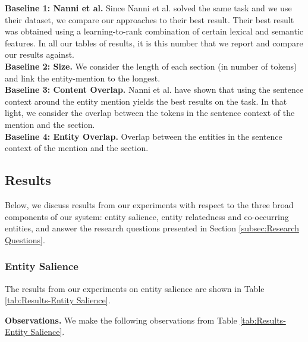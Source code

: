 \documentclass[sigconf,authordraft]{acmart}
\begin{document}
\textbf{Baseline 1: Nanni et al.} Since Nanni et al. \cite{nanni2018entity} solved the same task and we use their dataset, we compare our approaches to their best result. Their best result was obtained using a learning-to-rank combination of certain lexical and semantic features. In all our tables of results, it is this number that we report and compare our results against.\\
\textbf{Baseline 2: Size.} We consider the length of each section (in number of tokens) and link the entity-mention to the longest. \\
\textbf{Baseline 3: Content Overlap.} Nanni et al. \cite{nanni2018entity} have shown that using the sentence context around the entity mention yields the best results on the task. In that light, we consider the overlap between the tokens in the sentence context of the mention and the section. \\
\textbf{Baseline 4: Entity Overlap.} Overlap between the entities in the sentence context of the mention and the section. \\

\subsection{Results}
\label{subsec:Results}
Below, we discuss results from our experiments with respect to the three broad components of our system: entity salience, entity relatedness and co-occurring entities, and answer the research questions presented in Section \ref{subsec:Research Questions}.

\subsubsection{Entity Salience}
\label{subsubsec:Entity Salience}

The results from our experiments on entity salience are shown in Table \ref{tab:Results-Entity Salience}. 

\textbf{Observations.} We make the following observations from Table \ref{tab:Results-Entity Salience}.
\end{document}

